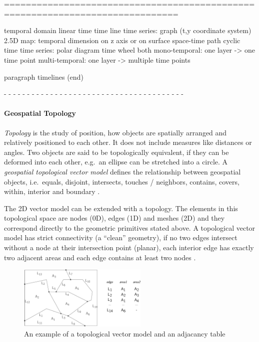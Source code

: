 ==============================================================================


temporal domain
  linear time
    time line
    time series: graph (t,y coordinate system)
    2.5D map: temporal dimension on z axis or on surface
    space-time path
  cyclic time
    time series: polar diagram
    time wheel
  both
    mono-temporal: one layer -> one time point
    multi-temporal: one layer -> multiple time points
\cite[p. 144]{ott2001time}

paragraph timelines (end)


- - - - - - - - - - - - - - - - - - - - - - - - - - - - - - - - - - - - - - -
\paragraph{Geospatial Topology} %
\label{par:geospatial_topology}

\emph{Topology} is the study of position, how objects are spatially arranged and relatively positioned to each other. It does not include measures like distances or angles. Two objects are said to be topologically equivalent, if they can be deformed into each other, e.g.\ an ellipse can be stretched into a circle. A \emph{geospatial topological vector model} defines the relationship between geospatial objects, i.e.\ equals, disjoint, intersects, touches / neighbors, contains, covers, within, interior and boundary
\cite{clementiniTopology}.

The 2D vector model can be extended with a topology. The elements in this topological space are nodes (0D), edges (1D) and meshes (2D) and they correspond directly to the geometric primitives stated above. A topological vector model has strict connectivity (a ``clean'' geometry), if no two edges intersect without a node at their intersection point (planar), each interior edge has exactly two adjacent areas and each edge contains at least two nodes
\cite[pp.37-39]{bolstad2008gis}.

\begin{figure}[ht]
  \centering
  \includegraphics[width=0.55\textwidth]{graphics/basics/topological_vector_model}
  \caption{An example of a topological vector model and an adjacancy table}
  \label{fig:topological_vector_model}
\end{figure}

